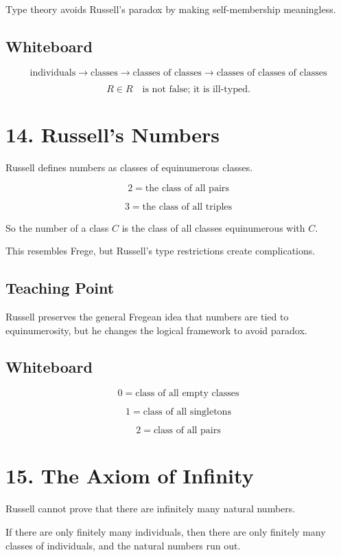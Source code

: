 \documentclass[11pt]{article}
\begin{document}
Type theory avoids Russell's paradox by making self-membership meaningless.

\subsection*{Whiteboard}

\[
\text{individuals}
\rightarrow
\text{classes}
\rightarrow
\text{classes of classes}
\rightarrow
\text{classes of classes of classes}
\]

\[
R \in R
\quad
\text{is not false; it is ill-typed.}
\]

\section*{14. Russell's Numbers}

Russell defines numbers as classes of equinumerous classes.

\[
2 = \text{the class of all pairs}
\]

\[
3 = \text{the class of all triples}
\]

So the number of a class \(C\) is the class of all classes equinumerous with \(C\).

This resembles Frege, but Russell's type restrictions create complications.

\subsection*{Teaching Point}

Russell preserves the general Fregean idea that numbers are tied to equinumerosity, but
he changes the logical framework to avoid paradox.

\subsection*{Whiteboard}

\[
0 = \text{class of all empty classes}
\]

\[
1 = \text{class of all singletons}
\]

\[
2 = \text{class of all pairs}
\]

\section*{15. The Axiom of Infinity}

Russell cannot prove that there are infinitely many natural numbers.

If there are only finitely many individuals, then there are only finitely many classes of
individuals, and the natural numbers run out.
\end{document}
